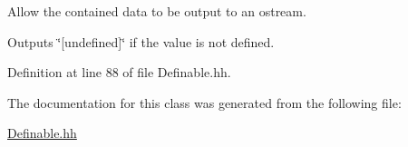 Allow the contained data to be output to an ostream. 

Outputs \char`\"{}\mbox{[}undefined\mbox{]}\char`\"{} if the value is not defined. 

Definition at line 88 of file Definable.\+hh.



The documentation for this class was generated from the following file\+:\begin{DoxyCompactItemize}
\item 
\hyperlink{_definable_8hh}{Definable.\+hh}\end{DoxyCompactItemize}
